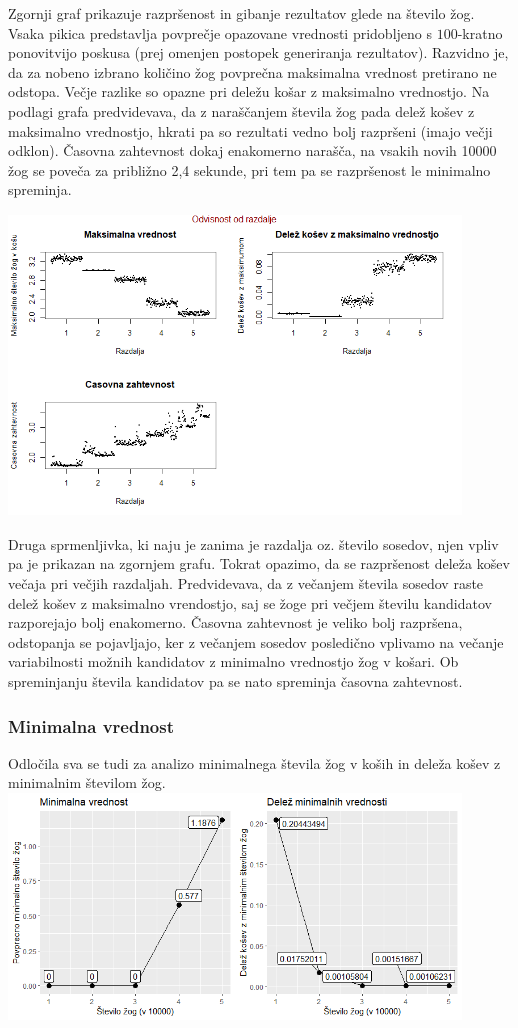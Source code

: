 \documentclass[a4paper, 11pt]{article}
\begin{document}
Zgornji graf prikazuje razpršenost in gibanje rezultatov glede na število žog. Vsaka pikica predstavlja povprečje opazovane vrednosti pridobljeno s $100$-kratno ponovitvijo poskusa (prej omenjen postopek generiranja rezultatov).
Razvidno je, da za nobeno izbrano količino žog povprečna maksimalna vrednost pretirano ne odstopa. Večje razlike so opazne pri deležu košar z maksimalno vrednostjo. Na podlagi grafa predvidevava, da z naraščanjem števila žog pada delež košev z maksimalno vrednostjo,
hkrati pa so rezultati vedno bolj razpršeni (imajo večji odklon).
Časovna zahtevnost dokaj enakomerno narašča, na vsakih novih 10000 žog se poveča za približno 2,4 sekunde, pri tem pa se razpršenost le minimalno spreminja.
\bigbreak


\includegraphics[width=12cm, height= 8cm]{dim1_glede_na_razdaljo1.png}

Druga sprmenljivka, ki naju je zanima je razdalja oz. število sosedov, njen vpliv pa je prikazan na zgornjem grafu.
Tokrat opazimo, da se razpršenost deleža košev večaja pri večjih razdaljah. Predvidevava, da z večanjem števila sosedov raste delež košev z maksimalno vrendostjo, saj se žoge pri večjem številu kandidatov razporejajo bolj enakomerno.
Časovna zahtevnost je veliko bolj razpršena, odstopanja se pojavljajo, ker z večanjem sosedov posledično vplivamo na večanje variabilnosti možnih kandidatov z minimalno vrednostjo žog v košari. Ob spreminjanju števila kandidatov pa se nato spreminja časovna zahtevnost.
\bigbreak

\subsubsection{Minimalna vrednost}
Odločila sva se tudi za analizo minimalnega števila žog v koših in deleža košev z minimalnim številom žog.
\bigbreak
\includegraphics[width=12cm, height=6cm]{minimum.png}
\end{document}
